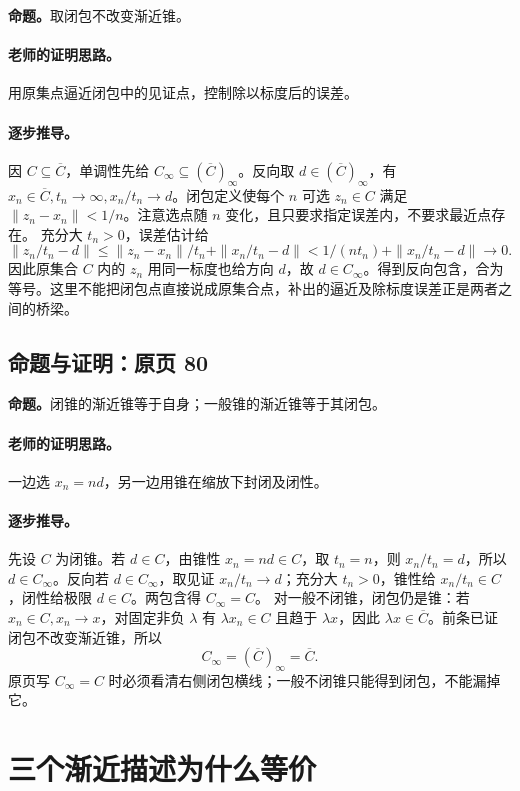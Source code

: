 \documentclass[11pt,a4paper]{article}
\theoremstyle{definition}\newtheorem{definition}{定义}\newtheorem{example}{例}
\begin{document}
\textbf{命题。}取闭包不改变渐近锥。

\paragraph{老师的证明思路。}用原集点逼近闭包中的见证点，控制除以标度后的误差。

\paragraph{逐步推导。}
因 $C\subseteq\overline C$，单调性先给 $C_\infty\subseteq(\overline C)_\infty$。反向取 $d\in(\overline C)_\infty$，有 $x_n\in\overline C,t_n\to\infty,x_n/t_n\to d$。闭包定义使每个 $n$ 可选 $z_n\in C$ 满足 $\|z_n-x_n\|<1/n$。注意选点随 $n$ 变化，且只要求指定误差内，不要求最近点存在。
充分大 $t_n>0$，误差估计给
\[\|z_n/t_n-d\|\le\|z_n-x_n\|/t_n+\|x_n/t_n-d\|<1/(nt_n)+\|x_n/t_n-d\|\to0.\]
因此原集合 $C$ 内的 $z_n$ 用同一标度也给方向 $d$，故 $d\in C_\infty$。得到反向包含，合为等号。这里不能把闭包点直接说成原集合点，补出的逼近及除标度误差正是两者之间的桥梁。


\subsection{命题与证明：原页 80}

\textbf{命题。}闭锥的渐近锥等于自身；一般锥的渐近锥等于其闭包。

\paragraph{老师的证明思路。}一边选 $x_n=nd$，另一边用锥在缩放下封闭及闭性。

\paragraph{逐步推导。}
先设 $C$ 为闭锥。若 $d\in C$，由锥性 $x_n=nd\in C$，取 $t_n=n$，则 $x_n/t_n=d$，所以 $d\in C_\infty$。反向若 $d\in C_\infty$，取见证 $x_n/t_n\to d$；充分大 $t_n>0$，锥性给 $x_n/t_n\in C$，闭性给极限 $d\in C$。两包含得 $C_\infty=C$。
对一般不闭锥，闭包仍是锥：若 $x_n\in C,x_n\to x$，对固定非负 $\lambda$ 有 $\lambda x_n\in C$ 且趋于 $\lambda x$，因此 $\lambda x\in\overline C$。前条已证闭包不改变渐近锥，所以
\[C_\infty=(\overline C)_\infty=\overline C.\]
原页写 $C_\infty=C$ 时必须看清右侧闭包横线；一般不闭锥只能得到闭包，不能漏掉它。


\clearpage\section{三个渐近描述为什么等价}\label{g:109:81}
\end{document}

